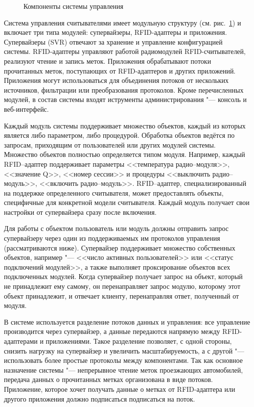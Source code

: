 \begin{figure}[ht]
  \caption{Компоненты системы управления}
  \label{fig:ch5_components}
\end{figure}

Система управления считывателями имеет модульную структуру (см. рис.~\ref{fig:ch5_components}) и включает три типа модулей: супервайзеры, RFID-адаптеры и приложения. Супервайзеры (SVR) отвечают за хранение и управление конфигурацией системы. RFID-адаптеры управляют работой радиомодулей RFID-считывателей, реализуют чтение и запись меток. Приложения обрабатывают потоки прочитанных меток, поступающих от RFID-адаптеров и других приложений. Приложения могут использоваться для объединения потоков от нескольких источников, фильтрации или преобразования протоколов. Кроме перечисленных модулей, в состав системы входят иструменты администрирования "--- консоль и веб-интерфейс.

Каждый модуль системы поддерживает множество объектов, каждый из которых является либо параметром, либо процедурой. Обработка объектов ведётся по запросам, приходящим от пользователей или других модулей системы. Множество объектов полностью определяется типом модуля. Например, каждый RFID--адаптер поддерживает параметры <<температура радио--модуля>>, <<значение Q>>, <<номер сессии>> и процедуры <<выключить радио--модуль>>, <<включить радио--модуль>>. RFID--адаптер, специализированный на поддержке определенного считывателя, может предоставлять объекты, специфичные для конкретной модели считывателя. Каждый модуль получает свои настройки от супервайзера сразу после включения.

Для работы с объектом пользователь или модуль должны отправить запрос супервайзеру через один из поддерживаемых им протоколов управления (рассматриваются ниже). Супервайзер поддерживает множество собственных объектов, например "--- <<число активных пользователей>> или <<статус подключений модулей>>, а также выполняет проксирование объектов всех подключенных модулей. Когда супервайзер получает запрос на объект, который не принадлежит ему самому, он перенаправляет запрос модулю, которому этот объект принадлежит, и отвечает клиенту, перенаправляя ответ, полученный от модуля.

В системе используется разделение потоков данных и управления: все управление производится через супервайзер, а данные передаются напрямую между RFID-адаптерами и приложениями. Такое разделение позволяет, с одной стороны, снизить нагрузку на супервайзер и увеличить масштабируемость, а с другой "--- использовать более простые протоколы между компонентами. Так как основное назначение системы "--- непрерывное чтение меток проезжающих автомобилей, передача данных о прочитанных метках организована в виде потоков. Приложение, которое хочет получать данные о метках от RFID-адаптера или другого приложения должно подписаться подписаться на поток.

